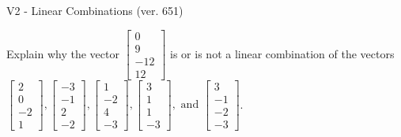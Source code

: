 \begin{exercise}
  \begin{exerciseTitle}V2 - Linear Combinations (ver. 651)\end{exerciseTitle}
  \begin{exerciseStatement}
    Explain why the vector \(\left[\begin{array}{c}
0 \\
9 \\
-12 \\
12
\end{array}\right]\)  is or is not a linear 
	combination of the vectors \(\left[\begin{array}{c}
2 \\
0 \\
-2 \\
1
\end{array}\right] , \left[\begin{array}{c}
-3 \\
-1 \\
2 \\
-2
\end{array}\right] , \left[\begin{array}{c}
1 \\
-2 \\
4 \\
-3
\end{array}\right] , \left[\begin{array}{c}
3 \\
1 \\
1 \\
-3
\end{array}\right] , \text{ and } \left[\begin{array}{c}
3 \\
-1 \\
-2 \\
-3
\end{array}\right]\).
	



\end{exerciseStatement}
\end{exercise}
